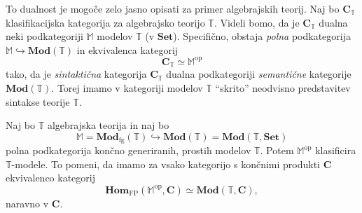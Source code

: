 \documentclass[../kategoricna_logika.tex]{subfiles}
\begin{document}
To dualnost je mogoče zelo jasno opisati za primer algebrajskih
teorij. Naj bo \(\mathbf{C}_{\mathbb{T}}\) klasifikacijska kategorija
za algebrajsko teorijo \(\mathbb{T}\). Videli bomo, da je \(\mathbf{C}_{\mathbb{T}}\)
dualna neki podkategoriji \(\mathbb{M}\) modelov \(\mathbb{T}\) (v \(\mathbf{Set}\)).
Specifično, obstaja \emph{polna} podkategorija 
\(\mathbb{\mathbb{M}} \hookrightarrow \mathbf{Mod}(\mathbb{T})\) in
ekvivalenca kategorij
\[ \mathbf{C}_{\mathbb{T}} \simeq \mathbb{M}^{\mathrm{op}} \]
tako, da je \emph{sintaktična} kategorija \(\mathbf{C}_{\mathbb{T}}\) dualna
podkategoriji \emph{semantične} ka\-tegorije \(\mathbf{Mod}(\mathbb{T})\).
Torej imamo v kategoriji modelov \(\mathbb{T}\) "`skrito"' neodvisno
predstavitev sintakse teorije \(\mathbb{T}\).
\begin{izrek}
  Naj bo $\mathbb{T}$ algebrajska teorija in naj bo
  \[ \mathbb{M} = \mathbf{Mod}_{\mathrm{fg}}(\mathbb{T}) \hookrightarrow \mathbf{Mod}(\mathbb{T}) = \mathbf{Mod}(\mathbb{T}, \mathbf{Set}) \]
  polna podkategorija končno generiranih, prostih modelov $\mathbb{T}$.
  Potem $\mathbb{M}^{\mathrm{op}}$ klasificira $\mathbb{T}$-modele.
  To pomeni, da imamo za vsako kategorijo s končnimi produkti $\mathbf{C}$ ekvivalenco kategorij
  \[ \mathbf{Hom}_{\mathrm{FP}}(\mathbb{M}^{\mathrm{op}}, \mathbf{C}) \simeq \mathbf{Mod}(\mathbb{T},\mathbf{C}), \]
  naravno v $\mathbf{C}$.
\end{izrek}
\end{document}
